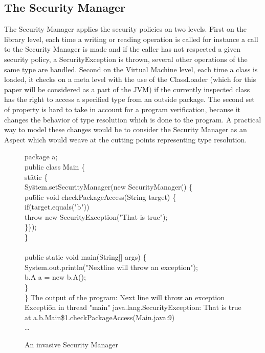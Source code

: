 \documentclass[draft]{llncs}
\begin{document}
\subsection{The Security Manager}
The Security Manager applies the security policies on two levels. First on the library level, each time a
writing or reading operation is called for instance a call to the Security Manager is made and if the
caller has not respected a given security policy, a SecurityException is thrown, several other operations
of the same type are handled. Second on the Virtual Machine level, each time a class is loaded, it checks on
a meta level with the use of the ClassLoader (which for this paper will be considered as a part of the
JVM) if the currently inspected class has the right to access a specified type from an outside package.
The second set of property is hard to take in account for a program verification, because it changes the 
behavior of type resolution which is done to the program.
A practical way to model these changes  would be to consider the Security Manager as an Aspect which
would weave at the cutting points representing type resolution.
\begin{figure}
\bcode
pa\=ckage a;\\
public class Main \{\+\\
  st\=atic \{\+\\
    Sy\=stem.setSecurityManager(new SecurityManager() \{\+\\
      pu\=blic void checkPackageAccess(String target) \{\+\\
        if\=(target.equals("b"))\\
          \>throw new SecurityException("That is true");\\
      \}\});\-\-\\
  \}\\
 \\
  public static void main(String[] args) \{\+\\
    System.out.println("Nextline will throw an exception");\\
    b.A a = new b.A();\-\\
  \}\-\\
\}
\ecode
The output of the program:
\bcode
Next line will throw an exception\\
Excepti\=on in thread "main" java.lang.SecurityException: That is true\+\\
	at a.b.Main\$1.checkPackageAccess(Main.java:9)\\
	\dots
\ecode
\caption{An invasive Security Manager}
\end{figure}
\end{document}
